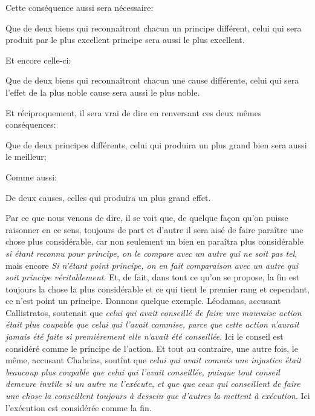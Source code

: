 \bigbreak

Cette conséquence aussi sera nécessaire:

\begin{lieu}
	Que de deux biens qui reconnaîtront chacun un principe différent, celui qui sera produit par le plus excellent principe
	sera aussi le plus excellent.
\end{lieu}

Et encore celle-ci:

\begin{lieu}
	Que de deux biens qui reconnaîtront chacun une cause différente, celui qui sera l'effet de la plus noble cause sera aussi
	le plus noble.
\end{lieu}

\bigbreak

Et réciproquement, il sera vrai de dire en renversant ces deux mêmes conséquences:

\begin{lieu}
	Que de deux principes différents, celui qui produira un plus grand bien sera aussi le meilleur;
\end{lieu}

Comme aussi:

\begin{lieu}
	De deux causes, celles qui produira un plus grand effet.
\end{lieu}

Par ce que nous venons de dire, il se voit que, de quelque façon qu'on puisse raisonner en ce sens, toujours de part et d'autre
il sera aisé de faire paraître une chose plus considérable, car non seulement un bien en paraîtra plus considérable \emph{si
étant reconnu pour principe, on le compare avec un autre qui ne soit pas tel}, mais encore \emph{Si n'étant point principe, on
en fait comparaison avec un autre qui soit principe véritablement}. Et, de fait, dans tout ce qu'on se propose, la fin est
toujours la chose la plus considérable et ce qui tient le premier rang et cependant, ce n'est point un principe. Donnons
quelque exemple. Léodamas, accusant Callistratos, soutenait que \emph{celui qui avait conseillé de faire une mauvaise action 
était plus coupable que celui qui l'avait commise, parce que cette action n'aurait jamais été faite si premièrement elle n'avait
été conseillée}. Ici le conseil est considéré comme le principe de l'action. Et tout au contraire, une autre fois, le même,
accusant Chabrias, soutînt que \emph{celui qui avait commis une injustice était beaucoup plus coupable que celui qui l'avait
conseillée, puisque tout conseil demeure inutile si un autre ne l’exécute, et que que ceux qui conseillent de faire une chose
la conseillent toujours à dessein que d'autres la mettent à exécution}. Ici l’exécution est considérée comme la fin.

